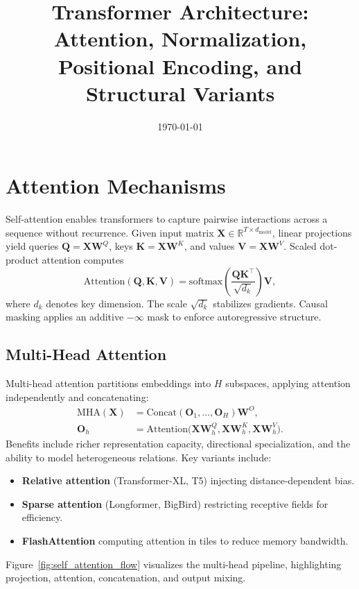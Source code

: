 \documentclass{article}
\title{Transformer Architecture: Attention, Normalization, Positional Encoding, and Structural Variants}
\author{}
\date{\today}
\begin{document}
\maketitle

\section{Attention Mechanisms}
Self-attention enables transformers to capture pairwise interactions across a sequence without recurrence. Given input matrix $\mathbf{X} \in \mathbb{R}^{T \times d_{\text{model}}}$, linear projections yield queries $\mathbf{Q} = \mathbf{X}\mathbf{W}^Q$, keys $\mathbf{K} = \mathbf{X}\mathbf{W}^K$, and values $\mathbf{V} = \mathbf{X}\mathbf{W}^V$. Scaled dot-product attention computes
\begin{equation}
  \mathrm{Attention}(\mathbf{Q}, \mathbf{K}, \mathbf{V}) = \mathrm{softmax}\left( \frac{\mathbf{Q}\mathbf{K}^{\top}}{\sqrt{d_k}} \right) \mathbf{V},
\end{equation}
where $d_k$ denotes key dimension. The scale $\sqrt{d_k}$ stabilizes gradients. Causal masking applies an additive $-\infty$ mask to enforce autoregressive structure.

\subsection{Multi-Head Attention}
Multi-head attention partitions embeddings into $H$ subspaces, applying attention independently and concatenating:
\begin{align}
  \mathrm{MHA}(\mathbf{X}) &= \mathrm{Concat}( \mathbf{O}_1, \ldots, \mathbf{O}_H ) \mathbf{W}^O, \\
  \mathbf{O}_h &= \mathrm{Attention}\big(\mathbf{X}\mathbf{W}_h^Q, \mathbf{X}\mathbf{W}_h^K, \mathbf{X}\mathbf{W}_h^V\big).
\end{align}
Benefits include richer representation capacity, directional specialization, and the ability to model heterogeneous relations. Key variants include:
\begin{itemize}
  \item \textbf{Relative attention} (Transformer-XL, T5) injecting distance-dependent bias.
  \item \textbf{Sparse attention} (Longformer, BigBird) restricting receptive fields for efficiency.
  \item \textbf{FlashAttention} computing attention in tiles to reduce memory bandwidth.
\end{itemize}
Figure~\ref{fig:self_attention_flow} visualizes the multi-head pipeline, highlighting projection, attention, concatenation, and output mixing.
\end{document}
